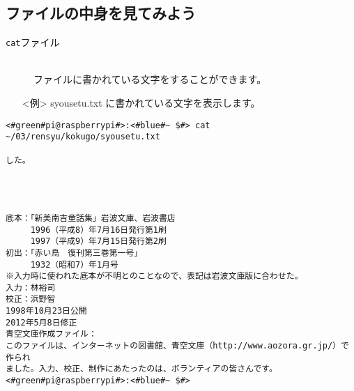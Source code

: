 \newpage
\subsection{ファイルの中身を見てみよう}
\begin{description}
\item[\texttt{cat}\textvisiblespace ファイル]\mbox{}\\
ファイルに書かれている文字をすることができます。
\end{description}
\begin{itemize}
\item[<例>]syousetu.txt に書かれている文字を表示します。
\end{itemize}
\begin{lstlisting}[caption=catの例, label=cat]
<#green#pi@raspberrypi#>:<#blue#~ $#> cat ~/03/rensyu/kokugo/syousetu.txt

した。




底本：「新美南吉童話集」岩波文庫、岩波書店
　　　1996（平成8）年7月16日発行第1刷
　　　1997（平成9）年7月15日発行第2刷
初出：「赤い鳥　復刊第三巻第一号」
　　　1932（昭和7）年1月号
※入力時に使われた底本が不明とのことなので、表記は岩波文庫版に合わせた。
入力：林裕司
校正：浜野智
1998年10月23日公開
2012年5月8日修正
青空文庫作成ファイル：
このファイルは、インターネットの図書館、青空文庫（http://www.aozora.gr.jp/）で作られ
ました。入力、校正、制作にあたったのは、ボランティアの皆さんです。<#green#pi@raspberrypi#>:<#blue#~ $#>
\end{lstlisting}

\begin{tcolorbox}[title=\useOmetoi]
\begin{enumerate}
\end{enumerate}
\end{tcolorbox}
